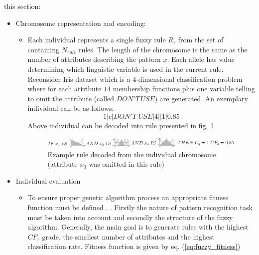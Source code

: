 this section:
\begin{itemize}
    \item Chromosome representation and encoding: 
        \begin{itemize}
            \item Each individual represents a single fuzzy rule $R_r$ from the
                set of containing $N_{rule}$ rules.
                The length of the chromosome is the same as the number of 
                attributes describing the pattern $x$. Each allele has value
                determining which linguistic variable is used in the current
                rule. Reconsider Iris dataset which is a $4$-dimensional
                classification problem where for each attribute $14$
                membership functions plus one variable telling to omit the
                attribute (called $DON'T \,USE$) are generated. 
                An exemplary individual can be as follows:
                $$1|c|DON'T \;USE|4||1|0.85$$
                Above individual can be decoded into rule presented in fig.
                \ref{fig:fuzzy_rule}
                \begin{figure}[H]
                    \begin{center}
                        \includegraphics[width=\textwidth]{fig/fuzzy_rule.png}
                    \end{center}
                    \caption{Example rule decoded from the individual
                    chromosome (attribute $x_3$ was omitted in this rule)}
                    \label{fig:fuzzy_rule}
                \end{figure}  
        \end{itemize}
    \item Individual evaluation
        \begin{itemize}
            \item To ensure proper genetic algorithm process an appropriate
                fitness function must be defined \cite{bib10}, \cite{bib21}. 
                Firstly the nature of pattern recognition task must be taken 
                into account and secondly the structure of the fuzzy algorithm. 
                Generally, the main goal is
                to generate rules with the highest $CF_r$ grade, the smallest number
                of attributes and the highest classification rate. Fitness
                function is given by eq. (\ref{eq:fuzzy_fitness})

\end{itemize}
\end{itemize}
